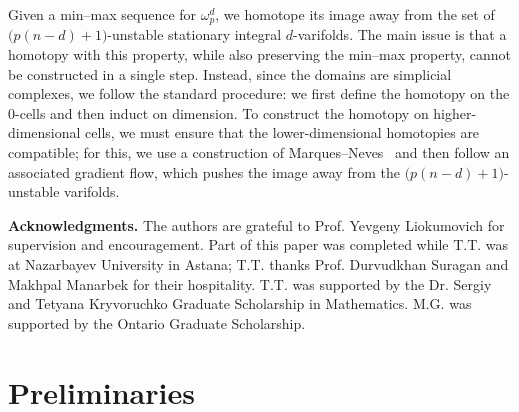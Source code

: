 \documentclass[12pt,english]{article}
\theoremstyle{definition}
\begin{document}
Given a min--max sequence for $\omega^d_p$, we homotope its image away from the set of $\bigl(p(n-d)+1\bigr)$-unstable stationary integral $d$-varifolds. The main issue is that a homotopy with this property, while also preserving the min--max property, cannot be constructed in a single step. Instead, since the domains are simplicial complexes, we follow the standard procedure: we first define the homotopy on the $0$-cells and then induct on dimension. To construct the homotopy on higher-dimensional cells, we must ensure that the lower-dimensional homotopies are compatible; for this, we use a construction of Marques--Neves~\cite{MarquesNeves} and then follow an associated gradient flow, which pushes the image away from the $\bigl(p(n-d)+1\bigr)$-unstable varifolds.

\textbf{Acknowledgments.}
The authors are grateful to Prof. Yevgeny Liokumovich for supervision and encouragement. Part of this paper was completed while T.T. was at Nazarbayev University in Astana; T.T. thanks Prof. Durvudkhan Suragan and Makhpal Manarbek for their hospitality. T.T. was supported by the Dr. Sergiy and Tetyana Kryvoruchko Graduate Scholarship in Mathematics. M.G. was supported by the Ontario Graduate Scholarship.

\section{Preliminaries}\label{prelim}
\end{document}
